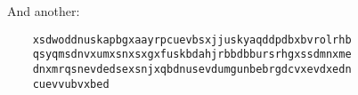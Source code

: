 And another:
  \begin{Verbatim}
    xsdwoddnuskapbgxaayrpcuevbsxjjuskyaqddpdbxbvrolrhb
    qsyqmsdnvxumxsnxsxgxfuskbdahjrbbdbbursrhgxssdmnxme
    dnxmrqsnevdedsexsnjxqbdnusevdumgunbebrgdcvxevdxedn
    cuevvubvxbed
  \end{Verbatim}

